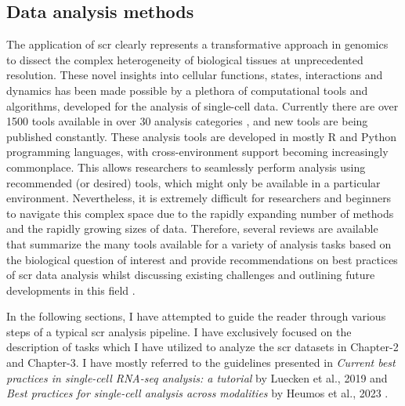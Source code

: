 

\subsection{Data analysis methods}
\label{sec:scrna_analysis}
The application of \gls{scr} clearly represents a transformative approach in genomics to dissect the complex heterogeneity of biological tissues at unprecedented resolution. These novel insights into cellular functions, states, interactions and dynamics has been made possible by  a plethora of computational tools and algorithms, developed for the analysis of single-cell data. Currently there are over 1500 tools available in over 30 analysis categories \textbf{\cite{noauthor_scrna-tools_nodate}}, and new tools are being published constantly. These analysis tools are developed in mostly R and Python programming languages, with cross-environment support becoming increasingly commonplace. This allows researchers to seamlessly perform analysis using recommended (or desired) tools, which might only be available in a particular environment. Nevertheless, it is extremely difficult for researchers and beginners to navigate this complex space due to the rapidly expanding number of methods and the rapidly growing sizes of data. Therefore, several reviews are available that summarize the many tools available for a variety of analysis tasks based on the biological question of interest and provide recommendations on best practices of \gls{scr} data analysis whilst discussing existing challenges and outlining future developments in this field \textbf{\cite{zappia_exploring_2018,wu_tools_2020,balzer_how_2021,su_data_2022,ke_single_2022,lueckenmalte_d_current_2019,heumos_best_2023}}.

\vspace{0.2cm}

\begin{Abstract}
\vspace{3mm}
In the following sections, I have attempted to guide the reader through various steps of a typical \gls{scr} analysis pipeline. I have exclusively focused on the description of tasks which I have utilized to analyze the \gls{scr} datasets in Chapter-2 and Chapter-3. I have mostly referred to the guidelines presented in \textit{Current best practices in single-cell RNA-seq analysis: a tutorial} by Luecken et al., 2019 \textbf{\cite{lueckenmalte_d_current_2019}} and \textit{Best practices for single-cell analysis across modalities} by Heumos et al., 2023 \textbf{\cite{heumos_best_2023}}.
\vspace{3mm}
\end{Abstract}

